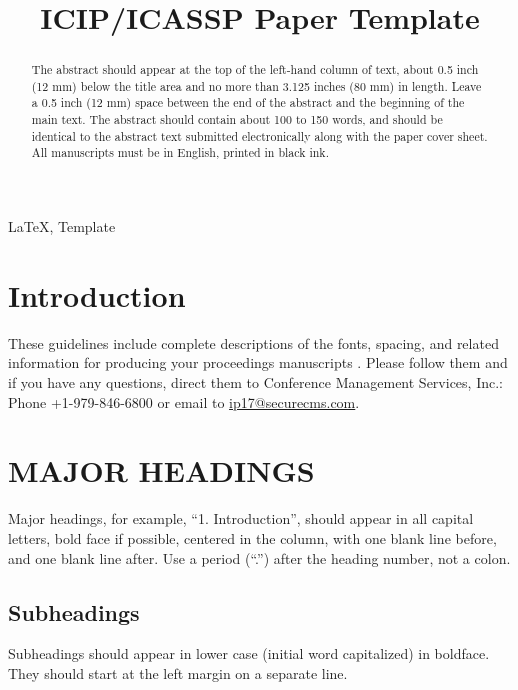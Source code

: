\documentclass{article}
\title{ICIP/ICASSP Paper Template}
\begin{document}
\ninept

\maketitle

\begin{abstract}
The abstract should appear at the top of the left-hand column of text, about
0.5 inch (12 mm) below the title area and no more than 3.125 inches (80 mm) in
length.  Leave a 0.5 inch (12 mm) space between the end of the abstract and the
beginning of the main text.  The abstract should contain about 100 to 150
words, and should be identical to the abstract text submitted electronically
along with the paper cover sheet.  All manuscripts must be in English, printed
in black ink.
\end{abstract}

\begin{keywords}
LaTeX, Template
\end{keywords}

\section{Introduction}
These guidelines include complete descriptions of the fonts, spacing,
and related information for producing your proceedings manuscripts
\cite{Example-Proceedings,Example-Article}.
Please follow them and if you have any questions, 
direct them to Conference Management Services, Inc.: 
Phone +1-979-846-6800 or email to \url{ip17@securecms.com}.

\section{MAJOR HEADINGS}
\label{sec:majhead}

Major headings, for example, ``1. Introduction'', should appear in all capital
letters, bold face if possible, centered in the column, with one blank line
before, and one blank line after. Use a period (``.'') after the heading number,
not a colon.

\subsection{Subheadings}
\label{ssec:subhead}

Subheadings should appear in lower case (initial word capitalized) in
boldface.  They should start at the left margin on a separate line.
 
\end{document}
